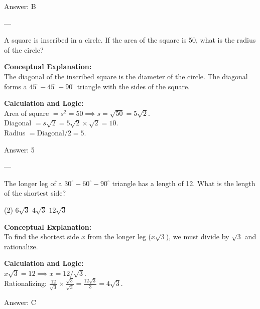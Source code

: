 \documentclass[11pt,paper=a4,answers]{exam}
\begin{document}
\begin{questions}
\begin{solution}
\vspace{15pt}
Answer: \colorbox{yellow!100}{B}
\end{solution}

---

\question
A square is inscribed in a circle. If the area of the square is 50, what is the radius of the circle?

\begin{solution}
\textbf{Conceptual Explanation:} \\
The diagonal of the inscribed square is the diameter of the circle. The diagonal forms a $45^\circ-45^\circ-90^\circ$ triangle with the sides of the square.

\vspace{10pt}
\textbf{Calculation and Logic:} \\
Area of square $= s^2 = 50 \implies s = \sqrt{50} = 5\sqrt{2}$. \\
Diagonal $= s\sqrt{2} = 5\sqrt{2} \times \sqrt{2} = 10$. \\
Radius $= \text{Diagonal} / 2 = 5$.

\vspace{15pt}
Answer: \colorbox{yellow!100}{5}
\end{solution}

---

\question
The longer leg of a $30^\circ-60^\circ-90^\circ$ triangle has a length of 12. What is the length of the shortest side?
\begin{tasks}(2)
    \task $6\sqrt{3}$
    \task $4\sqrt{3}$
    \task $12\sqrt{3}$
\end{tasks}

\begin{solution}
\textbf{Conceptual Explanation:} \\
To find the shortest side $x$ from the longer leg ($x\sqrt{3}$), we must divide by $\sqrt{3}$ and rationalize.

\vspace{10pt}
\textbf{Calculation and Logic:} \\
$x\sqrt{3} = 12 \implies x = 12 / \sqrt{3}$. \\
Rationalizing: $\frac{12}{\sqrt{3}} \times \frac{\sqrt{3}}{\sqrt{3}} = \frac{12\sqrt{3}}{3} = 4\sqrt{3}$.

\vspace{15pt}
Answer: \colorbox{yellow!100}{C}
\end{solution}


\end{questions}
\end{document}
